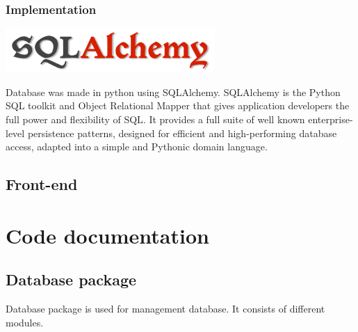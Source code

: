 \documentclass[12pt]{article}
\begin{document}
\subsubsection{Implementation}

\includegraphics{images/sqla.png}

Database was made in python using SQLAlchemy. SQLAlchemy is the Python SQL toolkit and Object Relational Mapper that gives application developers the full power and flexibility of SQL. It provides a full suite of well known enterprise-level persistence patterns, designed for efficient and high-performing database access, adapted into a simple and Pythonic domain language.




\subsection{Front-end}

\section{Code documentation}

\subsection{Database package}

Database package is used for management database. It consists of different modules.
\end{document}
